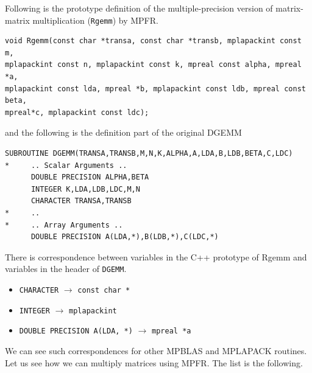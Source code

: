 \documentclass[12pt]{article}
\begin{document}
Following is the prototype definition of the multiple-precision version of matrix-matrix multiplication ({\tt Rgemm}) by MPFR.
\begin{verbatim}
void Rgemm(const char *transa, const char *transb, mplapackint const m, 
mplapackint const n, mplapackint const k, mpreal const alpha, mpreal *a, 
mplapackint const lda, mpreal *b, mplapackint const ldb, mpreal const beta, 
mpreal*c, mplapackint const ldc);
\end{verbatim}
and the following is the definition part of the original DGEMM 
\begin{verbatim}
SUBROUTINE DGEMM(TRANSA,TRANSB,M,N,K,ALPHA,A,LDA,B,LDB,BETA,C,LDC)
*     .. Scalar Arguments ..
      DOUBLE PRECISION ALPHA,BETA
      INTEGER K,LDA,LDB,LDC,M,N
      CHARACTER TRANSA,TRANSB
*     ..
*     .. Array Arguments ..
      DOUBLE PRECISION A(LDA,*),B(LDB,*),C(LDC,*)
\end{verbatim}
There is correspondence between variables in the C++ prototype of Rgemm and variables in the header of {\tt DGEMM}.
\begin{itemize}
    \item {\tt CHARACTER} $\rightarrow$ {\tt const char *}
    \item {\tt INTEGER} $\rightarrow$ {\tt mplapackint}
    \item {\tt DOUBLE PRECISION A(LDA, *)} $\rightarrow$ {\tt mpreal *a}
\end{itemize}
We can see such correspondences for other MPBLAS and MPLAPACK routines.
Let us see how we can multiply matrices using MPFR. 
The list is the following.
\end{document}
